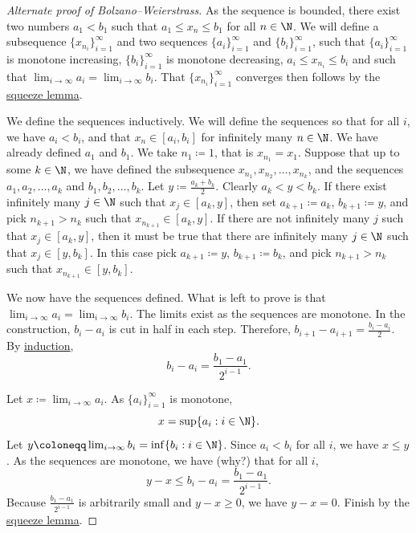 \begin{proof}[Alternate proof of Bolzano--Weierstrass]
As the sequence is bounded, there exist two numbers $a_1 < b_1$
such that $a_1 \leq x_n \leq b_1$ for all $n \in \N$.
We will define a subsequence $\{ x_{n_i} \}_{i=1}^\infty$ and two
sequences $\{ a_i \}_{i=1}^\infty$ and $\{ b_i \}_{i=1}^\infty$, such that
$\{ a_i \}_{i=1}^\infty$ is monotone increasing, $\{ b_i \}_{i=1}^\infty$ is monotone decreasing,
$a_i \leq x_{n_i} \leq b_i$ and such that $\lim_{i\to\infty} a_i =
\lim_{i\to\infty} b_i$.   That
$\{ x_{n_i} \}_{i=1}^\infty$ converges then follows by the \hyperref[squeeze:lemma]{squeeze lemma}.

We define the sequences inductively.  We will define the sequences so that
for all $i$, we have $a_i < b_i$,
and that $x_n \in [a_i,b_i]$ for infinitely many $n \in \N$.
We have already defined $a_1$ and $b_1$.  We take $n_1 \coloneqq 1$, that is
$x_{n_1} = x_1$.
Suppose that up to some $k \in \N$,
we have defined the subsequence $x_{n_1}, x_{n_2}, \ldots,
x_{n_k}$, and the sequences $a_1,a_2,\ldots,a_k$
and $b_1,b_2,\ldots,b_k$.
Let $y \coloneqq \frac{a_k+b_k}{2}$.
Clearly
$a_k < y < b_k$.  If there exist infinitely many $j \in \N$
such that $x_j \in [a_k,y]$, then set $a_{k+1} \coloneqq a_k$, $b_{k+1}
\coloneqq y$,
and pick $n_{k+1} > n_{k}$
such that $x_{n_{k+1}} \in [a_k,y]$.  If there are not infinitely many 
$j$ such that 
$x_j \in [a_k,y]$, then it must be true that there are infinitely many $j \in
\N$ such that 
$x_j \in [y,b_k]$.  In this case pick $a_{k+1} \coloneqq y$, $b_{k+1}
\coloneqq b_k$,
and pick $n_{k+1} > n_{k}$
such that $x_{n_{k+1}} \in [y,b_k]$.

We now have the sequences defined.  What is left to prove is that
$\lim_{i\to\infty} a_i = \lim_{i\to\infty} b_i$.  The limits exist as the sequences
are monotone.  In the construction,
$b_i - a_i$ is cut in half in each step.  Therefore,
$b_{i+1} - a_{i+1} = \frac{b_i-a_i}{2}$.  By
\hyperref[induction:thm]{induction},
\begin{equation*}
b_i - a_i = \frac{b_1-a_1}{2^{i-1}} .
\end{equation*}

Let $x \coloneqq \lim_{i\to\infty} a_i$.  As $\{ a_i \}_{i=1}^\infty$ is monotone,
\begin{equation*}
x = \sup \{ a_i : i \in \N \} .
\end{equation*}
Let $y \coloneqq \lim_{i\to\infty} b_i = \inf \{ b_i : i \in \N \}$.  Since $a_i < b_i$ for
all $i$, we have $x \leq y$.
As the sequences are monotone, we have (why?) that for all $i$,
\begin{equation*}
y-x \leq b_i-a_i = \frac{b_1-a_1}{2^{i-1}} .
\end{equation*}
Because $\frac{b_1-a_1}{2^{i-1}}$ is arbitrarily small and $y-x \geq 0$,
we have $y-x = 0$.  Finish by the \hyperref[squeeze:lemma]{squeeze lemma}.
\end{proof}



